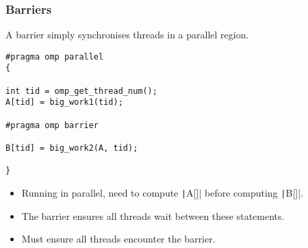 \documentclass{beamer}
\begin{document}
% 
% 
% 
% 
%
\begin{frame}[fragile]
\frametitle{Barriers}
A barrier simply synchronises threads in a parallel region.

\begin{verbatim}
#pragma omp parallel
{

int tid = omp_get_thread_num();
A[tid] = big_work1(tid);

#pragma omp barrier

B[tid] = big_work2(A, tid);

}
\end{verbatim}

\begin{itemize}
  \item Running in parallel, need to compute \texttt|A[]| before computing \texttt|B[]|.
  \item The barrier ensures all threads wait between these statements.
  \item Must ensure all threads encounter the barrier.
\end{itemize}

\end{frame}
\end{document}
